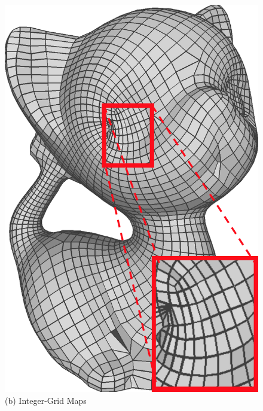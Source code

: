 \begin{figure}
\begin{minipage}{0.16\textwidth}
  \includegraphics[width=\textwidth,height=1.33\textwidth]{quadriflow/result/area01.png}\\
   (b) Integer-Grid Maps
   \end{minipage}
    \begin{minipage}{0.16\textwidth}
 	\centering

\end{minipage}
\end{figure}
